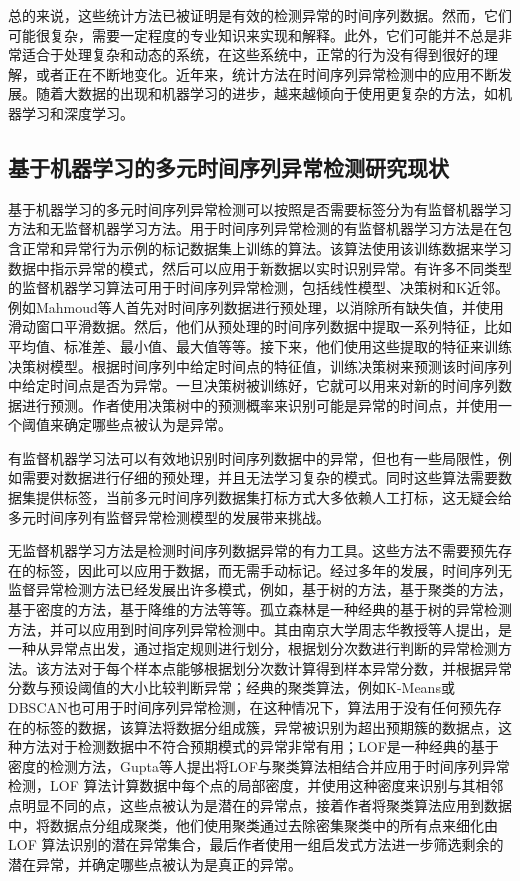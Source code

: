 总的来说，这些统计方法已被证明是有效的检测异常的时间序列数据。然而，它们可能很复杂，需要一定程度的专业知识来实现和解释。此外，它们可能并不总是非常适合于处理复杂和动态的系统，在这些系统中，正常的行为没有得到很好的理解，或者正在不断地变化。近年来，统计方法在时间序列异常检测中的应用不断发展。随着大数据的出现和机器学习的进步，越来越倾向于使用更复杂的方法，如机器学习和深度学习。

\subsection{基于机器学习的多元时间序列异常检测研究现状}

基于机器学习的多元时间序列异常检测可以按照是否需要标签分为有监督机器学习方法和无监督机器学习方法。用于时间序列异常检测的有监督机器学习方法是在包含正常和异常行为示例的标记数据集上训练的算法。该算法使用该训练数据来学习数据中指示异常的模式，然后可以应用于新数据以实时识别异常。有许多不同类型的监督机器学习算法可用于时间序列异常检测，包括线性模型、决策树和K近邻。例如Mahmoud等人\cite{none2}首先对时间序列数据进行预处理，以消除所有缺失值，并使用滑动窗口平滑数据。然后，他们从预处理的时间序列数据中提取一系列特征，比如平均值、标准差、最小值、最大值等等。接下来，他们使用这些提取的特征来训练决策树模型。根据时间序列中给定时间点的特征值，训练决策树来预测该时间序列中给定时间点是否为异常。一旦决策树被训练好，它就可以用来对新的时间序列数据进行预测。作者使用决策树中的预测概率来识别可能是异常的时间点，并使用一个阈值来确定哪些点被认为是异常。

有监督机器学习法可以有效地识别时间序列数据中的异常，但也有一些局限性，例如需要对数据进行仔细的预处理，并且无法学习复杂的模式。同时这些算法需要数据集提供标签，当前多元时间序列数据集打标方式大多依赖人工打标，这无疑会给多元时间序列有监督异常检测模型的发展带来挑战。

无监督机器学习方法是检测时间序列数据异常的有力工具。这些方法不需要预先存在的标签，因此可以应用于数据，而无需手动标记。经过多年的发展，时间序列无监督异常检测方法已经发展出许多模式，例如，基于树的方法，基于聚类的方法，基于密度的方法，基于降维的方法等等。孤立森林是一种经典的基于树的异常检测方法，并可以应用到时间序列异常检测中。其由南京大学周志华教授等人提出，是一种从异常点出发，通过指定规则进行划分，根据划分次数进行判断的异常检测方法。该方法对于每个样本点能够根据划分次数计算得到样本异常分数，并根据异常分数与预设阈值的大小比较判断异常；经典的聚类算法，例如K-Means\cite{k-means}或DBSCAN\cite{db-scan}也可用于时间序列异常检测，在这种情况下，算法用于没有任何预先存在的标签的数据，该算法将数据分组成簇，异常被识别为超出预期簇的数据点，这种方法对于检测数据中不符合预期模式的异常非常有用；LOF\cite{LOF}是一种经典的基于密度的检测方法，Gupta等人\cite{lof-app}提出将LOF与聚类算法相结合并应用于时间序列异常检测，LOF 算法计算数据中每个点的局部密度，并使用这种密度来识别与其相邻点明显不同的点，这些点被认为是潜在的异常点，接着作者将聚类算法应用到数据中，将数据点分组成聚类，他们使用聚类通过去除密集聚类中的所有点来细化由 LOF 算法识别的潜在异常集合，最后作者使用一组启发式方法进一步筛选剩余的潜在异常，并确定哪些点被认为是真正的异常。

